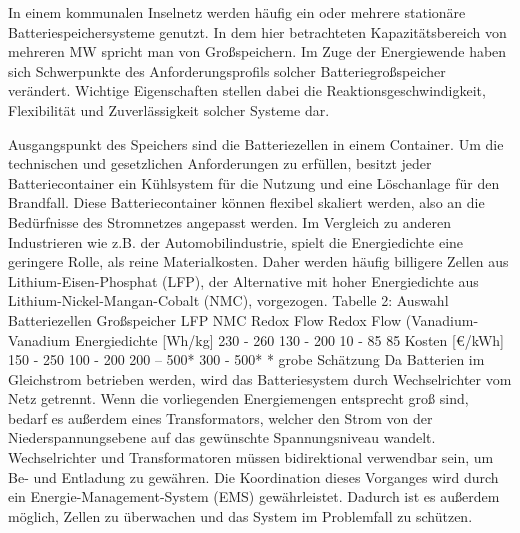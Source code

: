 In einem kommunalen Inselnetz werden häufig ein oder mehrere stationäre Batteriespeichersysteme genutzt. In dem hier betrachteten Kapazitätsbereich von mehreren MW spricht man von Großspeichern. Im Zuge der Energiewende haben sich Schwerpunkte des Anforderungsprofils solcher Batteriegroßspeicher verändert. Wichtige Eigenschaften stellen dabei die Reaktionsgeschwindigkeit, Flexibilität und Zuverlässigkeit solcher Systeme dar.
 

Ausgangspunkt des Speichers sind die Batteriezellen in einem Container. Um die technischen und gesetzlichen Anforderungen zu erfüllen, besitzt jeder Batteriecontainer ein Kühlsystem für die Nutzung und eine Löschanlage für den Brandfall. Diese Batteriecontainer können flexibel skaliert werden, also an die Bedürfnisse des Stromnetzes angepasst werden. Im Vergleich zu anderen Industrieren wie z.B. der Automobilindustrie, spielt die Energiedichte eine geringere Rolle, als reine Materialkosten. Daher werden häufig billigere Zellen aus Lithium-Eisen-Phosphat (LFP), der Alternative mit hoher Energiedichte aus Lithium-Nickel-Mangan-Cobalt (NMC), vorgezogen.
Tabelle 2: Auswahl Batteriezellen Großspeicher
	LFP	NMC	Redox Flow	Redox Flow (Vanadium- Vanadium
Energiedichte [Wh/kg] 	230 - 260	130 - 200	10 - 85	85
Kosten [€/kWh]	150 - 250	100 - 200	200 – 500*	300 - 500*
* grobe Schätzung
Da Batterien im Gleichstrom betrieben werden, wird das Batteriesystem durch Wechselrichter vom Netz getrennt. Wenn die vorliegenden Energiemengen entsprecht groß sind, bedarf es außerdem eines Transformators, welcher den Strom von der Niederspannungsebene auf das gewünschte Spannungsniveau wandelt. Wechselrichter und Transformatoren müssen bidirektional verwendbar sein, um Be- und Entladung zu gewähren. Die Koordination dieses Vorganges wird durch ein Energie-Management-System (EMS) gewährleistet. Dadurch ist es außerdem möglich, Zellen zu überwachen und das System im Problemfall zu schützen.

